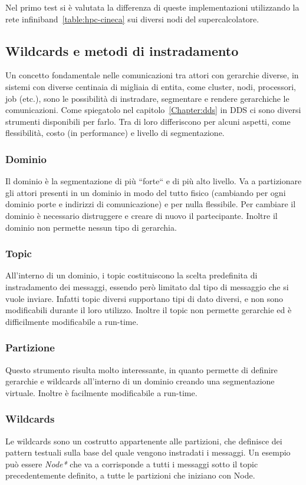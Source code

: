 Nel primo test si è valutata la differenza di queste implementazioni utilizzando la rete infiniband~\ref{table:hpc-cineca} sui diversi nodi del supercalcolatore. 

\subsection{Wildcards e metodi di instradamento}
Un concetto fondamentale nelle comunicazioni tra attori con gerarchie diverse, in sistemi con diverse centinaia di migliaia di entita, come cluster, nodi, processori, job (etc.), sono le possibilità di instradare, segmentare e rendere gerarchiche le comunicazioni. Come spiegatolo nel capitolo~\ref{Chapter:dds} in DDS ci sono diversi strumenti disponibili per farlo. Tra di loro differiscono per alcuni aspetti, come flessibilità, costo (in performance) e livello di segmentazione.

\subsubsection{Dominio} 
Il dominio è la segmentazione di più ``forte`` e di più alto livello. Va a partizionare gli attori presenti in un dominio in modo del tutto fisico (cambiando per ogni dominio porte e indirizzi di comunicazione) e per nulla flessibile. Per cambiare il dominio è necessario distruggere e creare di nuovo il partecipante. Inoltre il dominio non permette nessun tipo di gerarchia.
    
\subsubsection{Topic}
All'interno di un dominio, i topic costituiscono la scelta predefinita di instradamento dei messaggi, essendo però limitato dal tipo di messaggio che si vuole inviare. Infatti topic diversi supportano tipi di dato diversi, e non sono modificabili durante il loro utilizzo.
Inoltre il topic non permette gerarchie ed è difficilmente modificabile a run-time.

\subsubsection{Partizione}
Questo strumento risulta molto interessante, in quanto permette di definire gerarchie e wildcards all'interno di un dominio creando una segmentazione virtuale. Inoltre è facilmente modificabile a run-time.

\subsubsection{Wildcards}
Le wildcards sono un costrutto appartenente alle partizioni, che definisce dei pattern testuali sulla base del quale vengono instradati i messaggi. Un esempio può essere \textit{Node*} che va a corrisponde a tutti i messaggi sotto il topic precedentemente definito, a tutte le partizioni che iniziano con Node.

